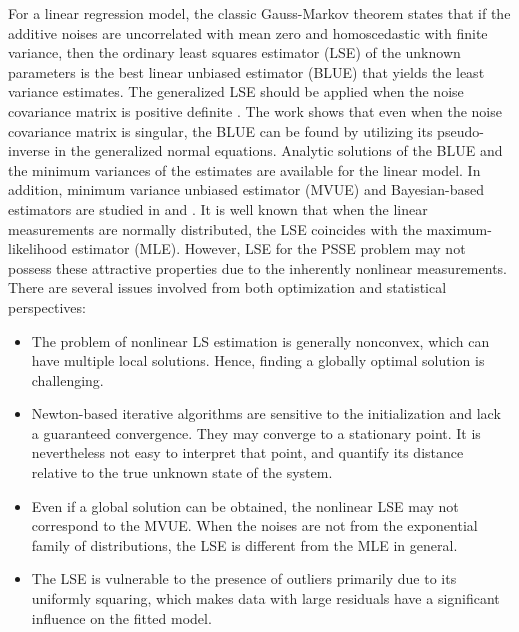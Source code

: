 \documentclass[journal,twoside]{IEEEtran}
\begin{document}
For a linear regression model, the classic Gauss-Markov theorem states that
if the additive noises are uncorrelated with mean zero and homoscedastic with finite variance,
then the ordinary least squares estimator (LSE) of the unknown parameters is the best linear unbiased estimator (BLUE)
that yields the least variance estimates. The generalized LSE should be applied when the noise covariance matrix is positive definite \cite{Bjorck96}. The work \cite{Zyskind69} shows that even when the noise covariance matrix is singular, the BLUE can be found by utilizing
its pseudo-inverse in the generalized normal equations.
Analytic solutions of the BLUE and the minimum variances of the estimates are available for the linear model.
In addition, minimum variance unbiased estimator (MVUE) and Bayesian-based estimators are studied
in \cite{Amini14} and \cite{Amini15}. It is well known that when the linear measurements are normally distributed, the LSE coincides with the maximum-likelihood estimator (MLE).
However, LSE for the PSSE problem may not possess these attractive properties due to the inherently nonlinear measurements. There are several issues involved from both optimization and statistical perspectives:
\begin{itemize}
\item The problem of nonlinear LS estimation is generally nonconvex, which can have multiple local solutions.
      Hence, finding a globally optimal solution is challenging.
\item Newton-based iterative algorithms are sensitive to the initialization and lack a guaranteed convergence.
      They may converge to a stationary point. It is nevertheless not easy to interpret that point,
      and quantify its distance relative to the true unknown state of the system.
\item Even if a global solution can be obtained, the nonlinear LSE may not correspond to the MVUE.
      When the noises are not from the exponential family of distributions, the LSE is different from the MLE in general.
\item The LSE is vulnerable to the presence of outliers primarily due to its uniformly squaring, which makes data with
      large residuals have a significant influence on the fitted model.
\end{itemize}
\end{document}
